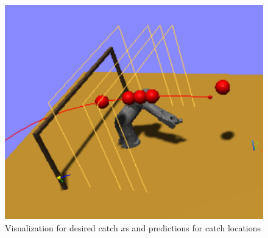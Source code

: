 \documentclass[a4paper]{article}
\begin{document}
\begin{figure}[!htbp]
\centering
\includegraphics[scale=0.6]{CatchLoc.PNG}
\caption{Visualization for desired catch $x$s and predictions for catch locations}
\end{figure}
\pagebreak
\end{document}
